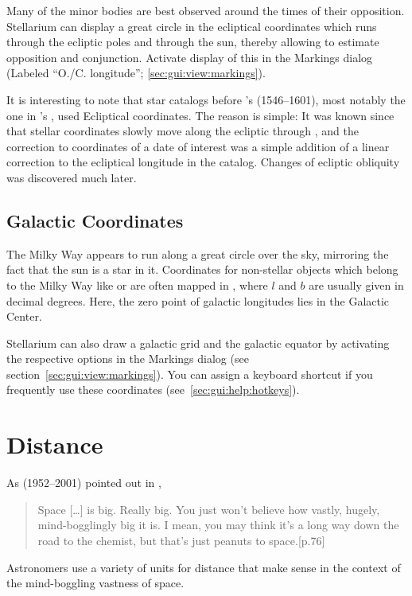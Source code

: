 Many of the minor bodies are best observed around the times of their
opposition.  Stellarium can display a great circle in the ecliptical
coordinates which runs through the ecliptic poles and through the sun,
thereby allowing to estimate opposition and conjunction. Activate
display of this  in the Markings dialog
(Labeled ``O./C. longitude''; \ref{sec:gui:view:markings}).


It is interesting to note that star catalogs before 's 
(1546--1601), most notably the one in 's
, used Ecliptical coordinates. The reason is
simple: It was known since  that stellar coordinates
slowly move along the ecliptic through , and the
correction to coordinates of a date of interest was a simple addition
of a linear correction to the ecliptical longitude in the
catalog. Changes of ecliptic obliquity was discovered much later.

\subsection{Galactic Coordinates}
\label{sec:Concepts:Galactic}

The Milky Way appears to run along a great circle over the sky,
mirroring the fact that the sun is a star in it. Coordinates for
non-stellar objects which belong to the Milky Way like
 or  are often mapped
in , 
where  $l$ and 
 $b$ are usually given in decimal
degrees. Here, the zero point of galactic longitudes lies in the
Galactic Center.

Stellarium can also draw a galactic grid and the galactic equator by
activating the respective options in the Markings dialog (see
section~\ref{sec:gui:view:markings}). You can assign a keyboard
shortcut if you frequently use these coordinates
(see~\ref{sec:gui:help:hotkeys}).


\section{Distance}
\label{sec:Concepts:Distance}

As  (1952--2001) pointed out in ,
\begin{quote}
  Space [\ldots] is big. Really big. You just won't believe how vastly, hugely,
  mind-bogglingly big it is. I mean, you may think it's a long way
  down the road to the chemist, but that's just peanuts to
  space.[p.76]
\end{quote}
%
Astronomers use a variety of units for distance that make sense in the
context of the mind-boggling vastness of space.

